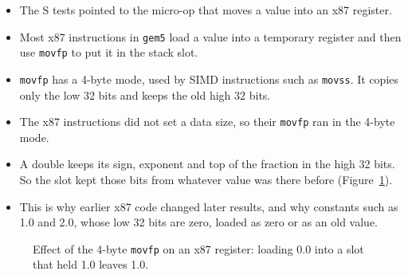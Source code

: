 \begin{itemize}
    \item The S tests pointed to the micro-op that moves a value into an x87 register.
    \item Most x87 instructions in \texttt{gem5} load a value into a temporary register and then use \texttt{movfp} to put it in the stack slot.
    \item \texttt{movfp} has a 4-byte mode, used by SIMD instructions such as \texttt{movss}. It copies only the low 32 bits and keeps the old high 32 bits.
    \item The x87 instructions did not set a data size, so their \texttt{movfp} ran in the 4-byte mode.
    \item A double keeps its sign, exponent and top of the fraction in the high 32 bits. So the slot kept those bits from whatever value was there before (Figure~\ref{fig:chr_movfp}).
    \item This is why earlier x87 code changed later results, and why constants such as 1.0 and 2.0, whose low 32 bits are zero, loaded as zero or as an old value.
\end{itemize}

\begin{figure}[H]
\centering
{}
\caption{Effect of the 4-byte \texttt{movfp} on an x87 register: loading 0.0 into a slot that held 1.0 leaves 1.0.}
\label{fig:chr_movfp}
\end{figure}

